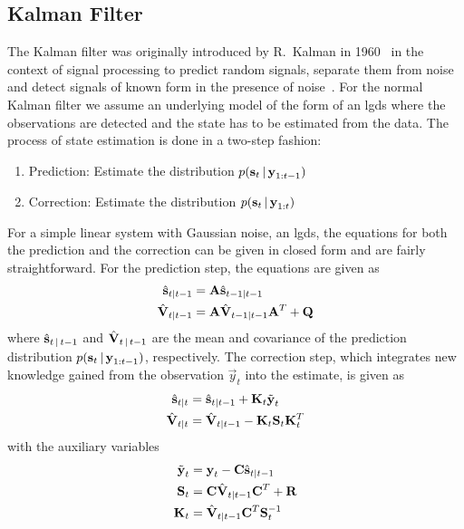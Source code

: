 	\subsection{Kalman Filter}
		The Kalman filter was originally introduced by R.~Kalman in 1960~\cite{kalmanNewApproachLinear1960} in the context of signal processing to predict random signals, separate them from noise and detect signals of known form in the presence of noise~\cite{kalmanNewApproachLinear1960}. For the normal Kalman filter we assume an underlying model of the form of an \ac{lgds} where the observations are detected and the state has to be estimated from the data. The process of state estimation is done in a two-step fashion:
		\begin{enumerate}
			\item Prediction: \tabto{2.5cm} Estimate the distribution \( p(\boldsymbol{\mathrm{s}}_t \,\vert\, \boldsymbol{\mathrm{y}}_{1:t - 1}) \)
			\item Correction: \tabto{2.5cm} Estimate the distribution \( p(\boldsymbol{\mathrm{s}}_t \,\vert\, \boldsymbol{\mathrm{y}}_{1:t}) \)
		\end{enumerate}
		For a simple linear system with Gaussian noise, \ie an \ac{lgds}, the equations for both the prediction and the correction can be given in closed form and are fairly straightforward. For the prediction step, the equations are given as
		\begin{align}
			\hat{\boldsymbol{\mathrm{s}}}_{t \vert t - 1} &= \boldsymbol{\mathrm{A}} \hat{\boldsymbol{\mathrm{s}}}_{t - 1 \vert t - 1}  \label{eqn:kfStatePre} \\
			\hat{\boldsymbol{\mathrm{V}}}_{t \vert t - 1} &= \boldsymbol{\mathrm{A}} \hat{\boldsymbol{\mathrm{V}}}_{t - 1 \vert t - 1} \boldsymbol{\mathrm{A}}^T + \boldsymbol{\mathrm{Q}}  \label{eqn:kfCovPre}
		\end{align}
		where \( \hat{\boldsymbol{\mathrm{s}}}_{t \,\vert\, t - 1} \) and \( \hat{\boldsymbol{\mathrm{V}}}_{t \,\vert\, t - 1} \) are the mean and covariance of the prediction distribution \( p(\boldsymbol{\mathrm{s}}_t \,\vert\, \boldsymbol{\mathrm{y}}_{1:t - 1}) \), respectively. The correction step, which integrates new knowledge gained from the observation \( \vec{y}_t \) into the estimate, is given as
		\begin{align}
			\hat{\boldsymbol{\mathrm{s}}}_{t \vert t} &= \hat{\boldsymbol{\mathrm{s}}}_{t \vert t - 1} + \boldsymbol{\mathrm{K}}_t \tilde{\boldsymbol{\mathrm{y}}}_t  \label{eqn:kfStatePost} \\
			\hat{\boldsymbol{\mathrm{V}}}_{t \vert t} &= \hat{\boldsymbol{\mathrm{V}}}_{t \vert t - 1} - \boldsymbol{\mathrm{K}}_t \boldsymbol{\mathrm{S}}_t \boldsymbol{\mathrm{K}}_t^T  \label{eqn:kfCovPost}
		\end{align}
		with the auxiliary variables
		\begin{align}
			\tilde{\boldsymbol{\mathrm{y}}}_t &= \boldsymbol{\mathrm{y}}_t - \boldsymbol{\mathrm{C}} \hat{\boldsymbol{\mathrm{s}}}_{t \vert t - 1}  \label{eqn:kfInno} \\
			\boldsymbol{\mathrm{S}}_t &= \boldsymbol{\mathrm{C}} \hat{\boldsymbol{\mathrm{V}}}_{t \vert t - 1} \boldsymbol{\mathrm{C}}^T + \boldsymbol{\mathrm{R}}  \label{eqn:kfResCov} \\
			\boldsymbol{\mathrm{K}}_t &= \hat{\boldsymbol{\mathrm{V}}}_{t \vert t - 1} \boldsymbol{\mathrm{C}}^T \boldsymbol{\mathrm{S}}_t^{-1}  \label{eqn:kfKalmanGain}
		\end{align}
